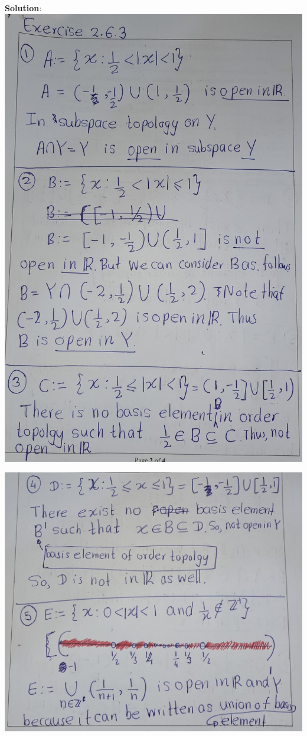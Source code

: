 \documentclass[
]{book}
\theoremstyle{definition}
\theoremstyle{definition}
\theoremstyle{definition}
\theoremstyle{definition}
\theoremstyle{remark}
\begin{document}
\textbf{Solution}:
\includegraphics{figures/Exercises/Ex 2.16/ex-3-1.jpg}

\includegraphics{figures/Exercises/Ex 2.16/ex-3-2.jpg}
\end{document}

